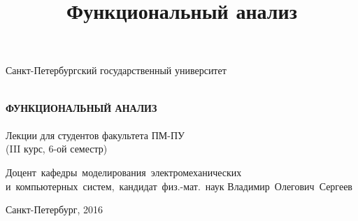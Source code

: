 \documentclass[12pt,a4paper,titlepage, oneside]{book}
\title{Функциональный анализ}
\theoremstyle{definition}
\theoremstyle{plain}
\theoremstyle{remark}
\theoremstyle{remark}
\theoremstyle{remark}
\theoremstyle{remark}
\theoremstyle{plain}
\theoremstyle{plain}
\begin{document}
\begin{titlepage}

\begin{center}
\vfill

Санкт-Петербургский государственный университет\\
\ \\

\vfill

{\large\bf ФУНКЦИОНАЛЬНЫЙ АНАЛИЗ\\}
\ \\
Лекции для студентов факультета ПМ-ПУ\\
(III курс, 6-ой семестр)

\vfill

\hfill\vbox
{
\hbox{Доцент кафедры моделирования электромеханических}
\hbox{и компьютерных систем, кандидат физ.-мат. наук}
\hbox{Владимир Олегович Сергеев}
}

\vfill

Санкт-Петербург, 2016
\end{center}

\end{titlepage}
\end{document}
